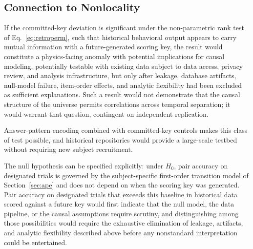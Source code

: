 \documentclass[11pt,letterpaper]{article}
\begin{document}
\subsection{Connection to Nonlocality}

If the committed-key deviation is significant under the non-parametric rank test of Eq.~\ref{eq:retroperm}, such that historical behavioral output appears to carry mutual information with a future-generated scoring key, the result would constitute a physics-facing anomaly with potential implications for causal modeling, potentially testable with existing data subject to data access, privacy review, and analysis infrastructure, but only after leakage, database artifacts, null-model failure, item-order effects, and analytic flexibility had been excluded as sufficient explanations. Such a result would not demonstrate that the causal structure of the universe permits correlations across temporal separation; it would warrant that question, contingent on independent replication.

Answer-pattern encoding combined with committed-key controls makes this class of test possible, and historical repositories would provide a large-scale testbed without requiring new subject recruitment.

The null hypothesis can be specified explicitly: under $H_0$, pair accuracy on designated trials is governed by the subject-specific first-order transition model of Section~\ref{sec:ape} and does not depend on when the scoring key was generated. Pair accuracy on designated trials that exceeds this baseline in historical data scored against a future key would first indicate that the null model, the data pipeline, or the causal assumptions require scrutiny, and distinguishing among those possibilities would require the exhaustive elimination of leakage, artifacts, and analytic flexibility described above before any nonstandard interpretation could be entertained.
\end{document}

